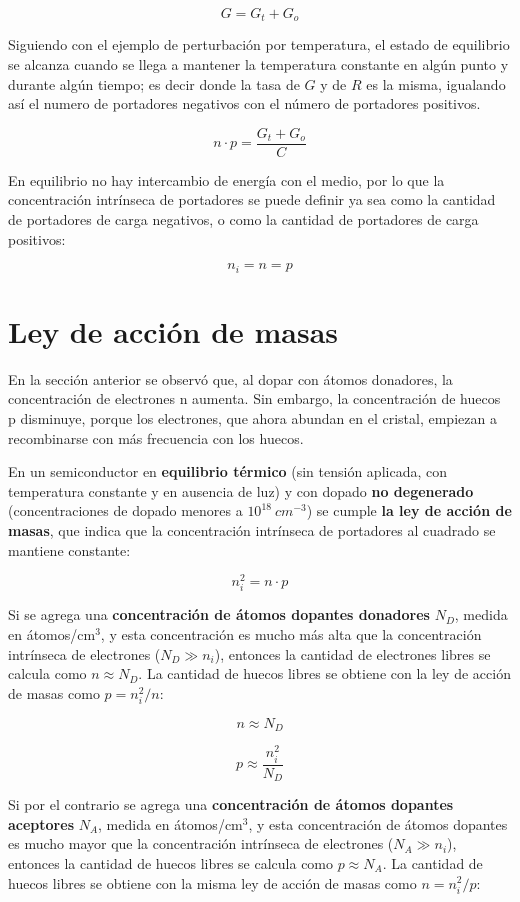 \[ G = G_{t} + G_{o} \]

Siguiendo con el ejemplo de perturbación por temperatura, el estado de equilibrio se alcanza cuando se llega a mantener la temperatura constante en algún punto y durante algún tiempo; es decir donde la tasa de $G$ y de $R$ es la misma, igualando así el numero de portadores negativos con el número de portadores positivos.

\[ n \cdot p =  \dfrac{G_{t} + G_{o}}{C} \]

En equilibrio no hay intercambio de energía con el medio, por lo que la concentración intrínseca de portadores se puede definir ya sea como la cantidad de portadores de carga negativos, o como la cantidad de portadores de carga positivos:

\[ n_{i} =  n = p \]

\section{Ley de acción de masas}

En la sección anterior se observó que, al dopar con átomos donadores, la concentración de electrones n aumenta. Sin embargo, la concentración de huecos p disminuye, porque los electrones, que ahora abundan en el cristal, empiezan a recombinarse con más frecuencia con los huecos.

En un semiconductor en \textbf{equilibrio térmico} (sin tensión aplicada, con temperatura constante y en ausencia de luz) y con dopado \textbf{no degenerado} (concentraciones de dopado menores a $10^{18}\ cm^{-3}$) se cumple \textbf{la ley de acción de masas}, que indica que la concentración intrínseca de portadores al cuadrado se mantiene constante:

\[ n_i^2 = n \cdot p \]

Si se agrega una \textbf{concentración de átomos dopantes donadores} $N_D$, medida en átomos/cm$^3$, y esta concentración es mucho más alta que la concentración intrínseca de electrones ($N_D \gg n_i$), entonces la cantidad de electrones libres se calcula como $n\approx{}N_D$. La cantidad de huecos libres se obtiene con la ley de acción de masas como $p=n_i^2/n$:

\[ n \approx N_D \]

\[ p \approx \dfrac{n_i^2}{N_D} \]

Si por el contrario se agrega una \textbf{concentración de átomos dopantes aceptores} $N_A$, medida en átomos/cm$^3$, y esta concentración de átomos dopantes es mucho mayor que la concentración intrínseca de electrones ($N_A \gg n_i$), entonces la cantidad de huecos libres se calcula como $p\approx{}N_A$. La cantidad de huecos libres se obtiene con la misma ley de acción de masas como $n=n_i^2/p$:


